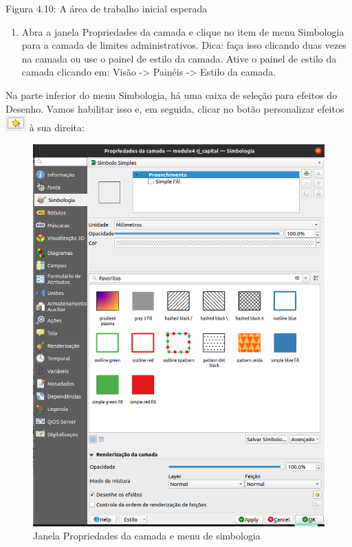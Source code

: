 \documentclass[
  portuguese,
]{krantz}
\providecommand{\tightlist}{%
  \setlength{\itemsep}{0pt}\setlength{\parskip}{0pt}}
\begin{document}
Figura 4.10: A área de trabalho inicial esperada

\begin{enumerate}
\def\labelenumi{\arabic{enumi}.}
\setcounter{enumi}{1}
\tightlist
\item
  Abra a janela Propriedades da camada e clique no item de menu Simbologia para a camada de limites administrativos. Dica: faça isso clicando duas vezes na camada ou use o painel de estilo da camada. Ative o painel de estilo da camada clicando em: Visão -\textgreater{} Painéis -\textgreater{} Estilo da camada.
\end{enumerate}

Na parte inferior do menu Simbologia, há uma caixa de seleção para efeitos do Desenho. Vamos habilitar isso e, em seguida, clicar no botão personalizar efeitos \includegraphics{media/modulo4/customise-effects-button.png} à sua direita:

\begin{figure}
\centering
\includegraphics{media/modulo4/draw-effects.png}
\caption{Janela Propriedades da camada e menu de simbologia}
\end{figure}
\end{document}
